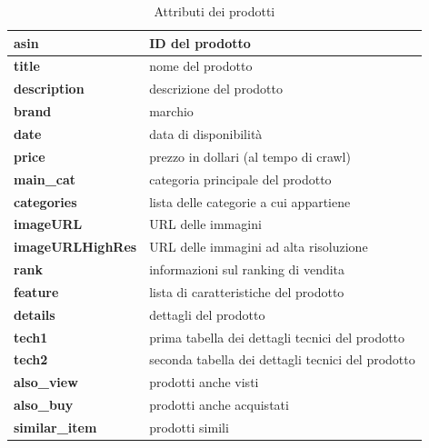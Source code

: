 \begin{table}[ht]
\centering
\begin{tabular}{|p{3.5cm}|p{7.5cm}|}
\hline
\textbf{asin}             & ID del prodotto                                                    \\ \hline
\textbf{title}            & nome del prodotto                                                  \\ \hline
\textbf{description}      & descrizione del prodotto                                           \\ \hline
\textbf{brand}            & marchio                                                            \\ \hline
\textbf{date}             & data di disponibilità                                              \\ \hline
\textbf{price}            & prezzo in dollari (al tempo di crawl)                              \\ \hline
\textbf{main{\_}cat}      & categoria principale del prodotto                                  \\ \hline
\textbf{categories}       & lista delle categorie a cui appartiene                             \\ \hline
\textbf{imageURL}         & URL delle immagini                                                 \\ \hline
\textbf{imageURLHighRes}  & URL delle immagini ad alta risoluzione                             \\ \hline
\textbf{rank}             & informazioni sul ranking di vendita                                \\ \hline
\textbf{feature}          & lista di caratteristiche del prodotto                              \\ \hline
\textbf{details}          & dettagli del prodotto                                              \\ \hline
\textbf{tech1}            & prima tabella dei dettagli tecnici del prodotto                    \\ \hline
\textbf{tech2}            & seconda tabella dei dettagli tecnici del prodotto                  \\ \hline
\textbf{also{\_}view}     & prodotti anche visti                                               \\ \hline
\textbf{also{\_}buy}      & prodotti anche acquistati                                          \\ \hline
\textbf{similar{\_}item}  & prodotti simili                                                    \\ \hline
\end{tabular}
\caption{Attributi dei prodotti}
\label{tab:attr-products}
\end{table}

